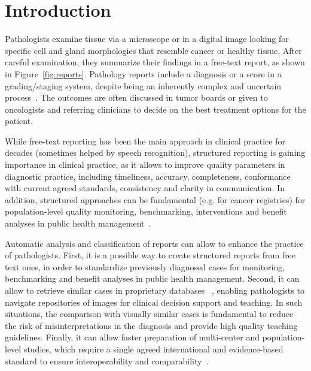 \documentclass[runningheads]{llncs}
\begin{document}
\section{Introduction}
%
Pathologists examine tissue via a microscope or in a digital image looking for specific cell and gland morphologies that resemble cancer or healthy tissue. After careful examination, they summarize their findings in a free-text report, as shown in Figure~\ref{fig:reports}. Pathology reports include a diagnosis or a score in a grading/staging system, despite being an inherently complex and uncertain process~\cite{PPA2009}. The outcomes are often discussed in tumor boards or given to oncologists and referring clinicians to decide on the best treatment options for the patient.

While free-text reporting has been the main approach in clinical practice for decades (sometimes helped by speech recognition), structured reporting is gaining importance in clinical practice, as it allows to improve quality parameters in diagnostic practice, including timeliness, accuracy, completeness, conformance with current agreed standards, consistency and clarity in communication.
In addition, structured approaches can be fundamental (e.g. for cancer registries) for population-level quality monitoring, benchmarking, interventions and benefit analyses in public health management~\cite{ellis2016does}.

Automatic analysis and classification of reports can allow to enhance the practice of pathologists.
First, it is a possible way to create structured reports from free text ones, in order to standardize previously diagnosed cases for monitoring, benchmarking and benefit analyses in public health management.
Second, it can allow to retrieve similar cases in proprietary databases ~\cite{schaer2019deep}, enabling pathologists to navigate repositories of images for clinical decision support and teaching. In such situations, the comparison with visually similar cases is fundamental to reduce the risk of misinterpretations in the diagnosis and provide high quality teaching guidelines.
Finally, it can allow faster preparation of multi-center and population-level studies, which require a single agreed international and evidence-based standard to ensure interoperability and comparability~\cite{ellis2016does}.
\end{document}
